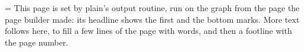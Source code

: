 \vsize=3in
\headline={\tenrm\firstmark\hfil\botmark}
\noindent{}This page is set by plain's output routine, run on the
graph from the page the page builder made: its headline shows the first and
the bottom marks. More text follows here, to fill a few lines of
the page with words, and then a footline with the page number.

\bye
